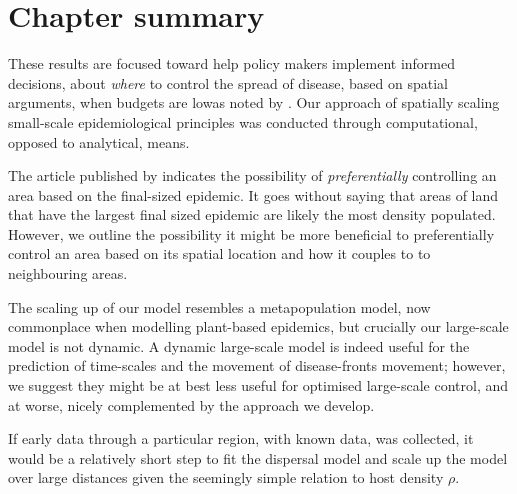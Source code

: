 \section{Chapter summary}


These results are focused toward help policy makers implement informed decisions, about \textit{where} to control the spread of disease, based on spatial arguments, when budgets are low\textemdash as noted by \cite{time-varying-infectivity}. Our approach of spatially scaling small-scale epidemiological principles was conducted through computational, opposed to analytical, means. 

The article published by \cite{time-varying-infectivity} indicates the possibility of \textit{preferentially} controlling an area based on the final-sized epidemic. It goes without saying that areas of land that have the largest final sized epidemic are likely the most density populated. However, we outline the possibility it might be more beneficial to preferentially control an area based on its spatial location and how it couples to to neighbouring areas.

The scaling up of our model resembles a metapopulation model, now commonplace when modelling plant-based epidemics, but crucially our large-scale model is not dynamic. A dynamic large-scale model is indeed useful for the prediction of time-scales and the movement of disease-fronts movement; however, we suggest they might be at best less useful for optimised large-scale control, and at worse, nicely complemented by the approach we develop.

If early data through a particular region, with known data, was collected, it would be a relatively short step to fit the dispersal model and scale up the model over large distances given the seemingly simple relation to host density $\rho$.


